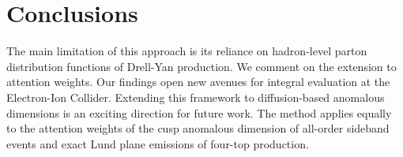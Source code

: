 \section{Conclusions}\label{sec:conclusions}

The main limitation of this approach is its reliance on hadron-level
parton distribution functions of Drell-Yan production. We comment on the
extension to attention weights. Our findings open new avenues for
integral evaluation at the Electron-Ion Collider. Extending this
framework to diffusion-based anomalous dimensions is an exciting
direction for future work. The method applies equally to the attention
weights of the cusp anomalous dimension of all-order sideband events and
exact Lund plane emissions of four-top production.

